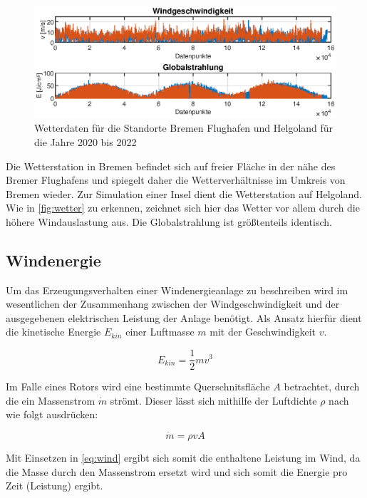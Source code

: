 \begin{figure}[H]
	\centering
	\includegraphics[width=\linewidth]{Abbildungen/Wetter20bis22.eps}
	\caption{Wetterdaten für die Standorte Bremen Flughafen und Helgoland für die Jahre 2020 bis 2022}
	\label{fig:wetter}
\end{figure}

Die Wetterstation in Bremen befindet sich auf freier Fläche in der nähe des Bremer Flughafens und spiegelt daher die Wetterverhältnisse im Umkreis von Bremen wieder. Zur Simulation einer Insel dient die Wetterstation auf Helgoland. Wie in \autoref{fig:wetter} zu erkennen, zeichnet sich hier das Wetter vor allem durch die höhere Windauslastung aus. Die Globalstrahlung ist größtenteils identisch.

\subsection{Windenergie}

Um das Erzeugungsverhalten einer Windenergieanlage zu beschreiben wird im wesentlichen der Zusammenhang zwischen der Windgeschwindigkeit und der ausgegebenen elektrischen Leistung der Anlage benötigt. Als Ansatz hierfür dient die kinetische Energie $E_{kin}$ einer Luftmasse $m$ mit der Geschwindigkeit $v$. \cite{Hau2016}

\begin{equation}
	E_{kin} = \frac{1}{2} mv^3
	\label{eq:wind}
\end{equation}

Im Falle eines Rotors wird eine bestimmte Querschnitsfläche $A$ betrachtet, durch die ein Massenstrom $\dot{m}$ strömt. Dieser lässt sich mithilfe der Luftdichte $\rho$ nach \cite{} wie folgt ausdrücken:

\begin{equation}
	\dot{m} = \rho vA
\end{equation}

Mit Einsetzen in \autoref{eq:wind} ergibt sich somit die enthaltene Leistung im Wind, da die Masse durch den Massenstrom ersetzt wird und sich somit die Energie pro Zeit (Leistung) ergibt.

